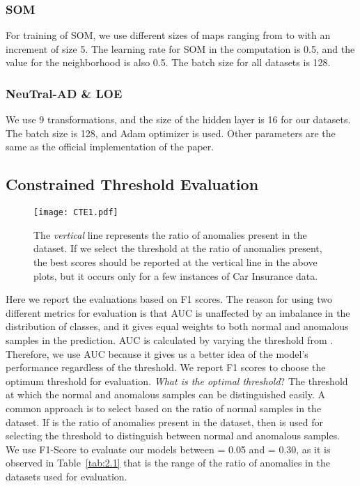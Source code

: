 \documentclass{article}
\begin{document}
\subsubsection{SOM}

For training of SOM, we use different sizes of maps ranging from  to  with an increment of size 5. The learning rate  for SOM in the computation is 0.5, and the  value for the neighborhood is also 0.5.  The batch size for all datasets is 128.

\subsubsection{NeuTral-AD \& LOE}

We use 9 transformations, and the size of the hidden layer is 16 for our datasets. The batch size is 128, and Adam optimizer is used. Other parameters are the same as the official implementation of the paper.

\subsection{Constrained Threshold Evaluation}\label{a6}

\begin{figure}[htbp]
    \centering
    \texttt{[image: CTE1.pdf]}
    \caption{The \textit{vertical} line represents the ratio of anomalies present in the dataset. If we select the threshold at the ratio of anomalies present, the best scores should be reported at the vertical line in the above plots, but it occurs only for a few instances of Car Insurance data.}
    \label{fig:cte}
\end{figure}

Here we report the evaluations based on F1 scores. The reason for using two different metrics for evaluation is that AUC is unaffected by an imbalance in the distribution of classes, and it gives equal weights to both normal and anomalous samples in the prediction. AUC is calculated by varying the threshold  from . Therefore, we use AUC because it gives us a better idea of the model's performance regardless of the threshold. We report F1 scores to choose the optimum threshold for evaluation. \textit{What is the optimal threshold}? The threshold at which the normal and anomalous samples can be distinguished easily. A common approach is to select  based on the ratio of normal samples in the dataset. If  is the ratio of anomalies present in the dataset, then  is used for selecting the threshold to distinguish between normal and anomalous samples. We use F1-Score to evaluate our models between  = 0.05 and  = 0.30, as it is observed in Table~\ref{tab:2.1} that is the range of the ratio of anomalies in the datasets used for evaluation.
\end{document}
